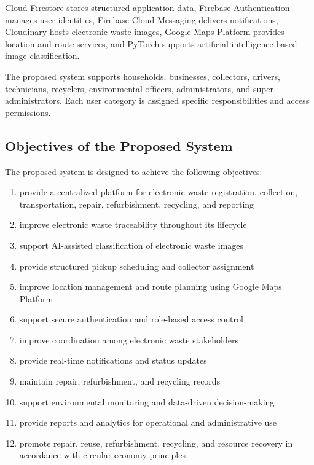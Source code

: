 Cloud Firestore stores structured application data, Firebase Authentication
manages user identities, Firebase Cloud Messaging delivers notifications,
Cloudinary hosts electronic waste images, Google Maps Platform provides
location and route services, and PyTorch supports artificial-intelligence-based
image classification.

The proposed system supports households, businesses, collectors, drivers,
technicians, recyclers, environmental officers, administrators, and super
administrators. Each user category is assigned specific responsibilities and access
permissions.

\subsection{Objectives of the Proposed System}
The proposed system is designed to achieve the following objectives:

\begin{enumerate}[leftmargin=1.4cm]
  \item provide a centralized platform for electronic waste registration, collection,
    transportation, repair, refurbishment, recycling, and reporting
  \item improve electronic waste traceability throughout its lifecycle
  \item support AI-assisted classification of electronic waste images
  \item provide structured pickup scheduling and collector assignment
  \item improve location management and route planning using Google Maps
    Platform
  \item support secure authentication and role-based access control
  \item improve coordination among electronic waste stakeholders
  \item provide real-time notifications and status updates
  \item maintain repair, refurbishment, and recycling records
  \item support environmental monitoring and data-driven decision-making
  \item provide reports and analytics for operational and administrative use
  \item promote repair, reuse, refurbishment, recycling, and resource recovery in
    accordance with circular economy principles
\end{enumerate}

